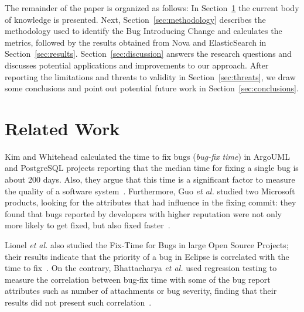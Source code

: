 \documentclass[10pt, conference]{IEEEtran}
\begin{document}
The remainder of the paper is organized as follows: In Section~\ref{sec:relatedwork} the current body of knowledge is presented. Next, Section~\ref{sec:methodology} describes the methodology used to identify the Bug Introducing Change and calculates the metrics, followed by the results obtained from Nova and ElasticSearch in Section~\ref{sec:results}. Section~\ref{sec:discussion} answers the research questions and discusses potential applications and improvements to our approach. After reporting the limitations and threats to validity in Section~\ref{sec:threats}, we draw some conclusions and point out potential future work in Section~\ref{sec:conclusions}.

\section{Related Work}
\label{sec:relatedwork}


Kim and Whitehead calculated the time to fix bugs (\emph{bug-fix time}) in ArgoUML and PostgreSQL projects reporting that the median time for fixing a single bug is about 200 days. Also, they argue that this time is a significant factor to measure the quality of a software system~\cite{kim2006long}. Furthermore, Guo \emph{et al.} studied two Microsoft products, looking for the attributes that had influence in the fixing commit: they found that bugs reported by developers with higher reputation were not only more likely to get fixed, but also fixed faster~\cite{guo2010characterizing}.

Lionel \emph{et al.} also studied the Fix-Time for Bugs in large Open Source Projects; their results indicate that the priority of a bug in Eclipse is correlated with the time to fix~\cite{marks2011studying}. On the contrary, Bhattacharya \emph{et al.} used regression testing to measure the correlation between bug-fix time with some of the bug report attributes such as number of attachments or bug severity, finding that their results did not present such correlation~\cite{bhattacharya2011bug}.

\end{document}
